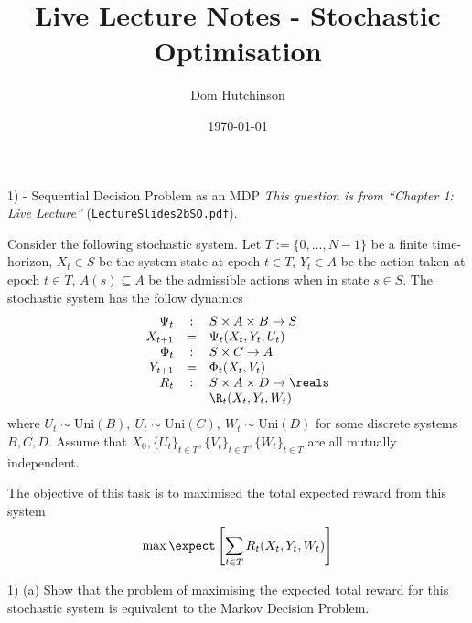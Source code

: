 \documentclass[11pt,a4paper]{article}
\begin{document}

\title{Live Lecture Notes - Stochastic Optimisation}
\author{Dom Hutchinson}
\date{\today}
\maketitle

\begin{question}{1) - Sequential Decision Problem as an MDP}
  \textit{This question is from ``Chapter 1: Live Lecture''} (\texttt{LectureSlides2bSO.pdf}).
  \par Consider the following stochastic system. Let $T:=\{0,\dots,N-1\}$ be a finite time-horizon, $X_t\in S$ be the system state at epoch $t\in T$, $Y_t\in A$ be the action taken at epoch $t\in T$, $A(s)\subseteq A$ be the admissible actions when in state $s\in S$. The stochastic system has the follow dynamics
  \[\begin{array}{rcl}
    \Psi_t&:&S\times A\times B\to S\\
    X_{t+1}&=&\Psi_t(X_t,Y_t,U_t)\\
    \Phi_t&:&S\times C\to A\\
    Y_{t+1}&=&\Phi_t(X_t,V_t)\\
    R_t&:&S\times A\times D\to \reals\\
    &&\R_t(X_t,Y_t,W_t)\\
  \end{array}\]
  where $U_t\sim\text{Uni}(B),\ U_t\sim\text{Uni}(C),\ W_t\sim\text{Uni}(D)$ for some discrete systems $B,C,D$. Assume that $X_0,\{U_t\}_{t\in T},\{V_t\}_{t\in T},\{W_t\}_{t\in T}$ are all mutually independent.
  \par The objective of this task is to maximised the total expected reward from this system
  \[ \max\expect\left[\sum_{t\in T}R_t(X_t,Y_t,W_t)\right] \]
\end{question}

\begin{question}{1) (a)}
  Show that the problem of maximising the expected total reward for this stochastic system is equivalent to the Markov Decision Problem.
\end{question}
\end{document}
